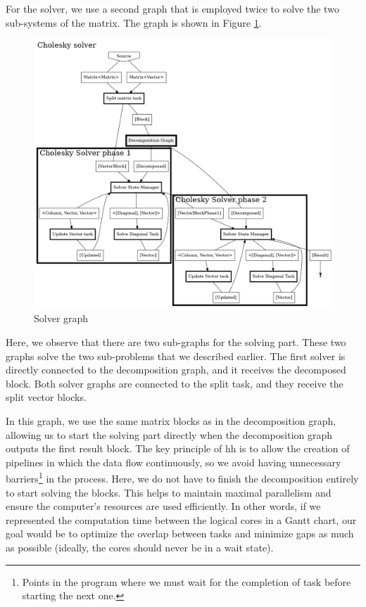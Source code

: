 For the solver, we use a second graph that is employed twice to solve the two
sub-systems of the matrix. The graph is shown in Figure \ref{fig:solvergraph}.

\begin{figure}[!ht]
  \begin{center}
    \includegraphics[scale=0.3]{img/cho-img/solver_graph.png}
    \caption{Solver graph}
    \label{fig:solvergraph}
  \end{center}
\end{figure}

Here, we observe that there are two sub-graphs for the solving part. These two
graphs solve the two sub-problems that we described earlier. The first solver is
directly connected to the decomposition graph, and it receives the decomposed
block. Both solver graphs are connected to the split task, and they receive the
split vector blocks.

In this graph, we use the same matrix blocks as in the decomposition graph,
allowing us to start the solving part directly when the decomposition graph
outputs the first result block. The key principle of \gls{hh} is to allow the
creation of pipelines in which the data flow continuously, so we avoid having
unnecessary barriers\footnote{Points in the program where we must wait for the
completion of task before starting the next one.} in the process. Here, we do
not have to finish the decomposition entirely to start solving the blocks. This
helps to maintain maximal parallelism and ensure the computer's resources are
used efficiently. In other words, if we represented the computation time between
the logical cores in a Gantt chart, our goal would be to optimize the overlap
between tasks and minimize gaps as much as possible (ideally, the cores should
never be in a wait state).

